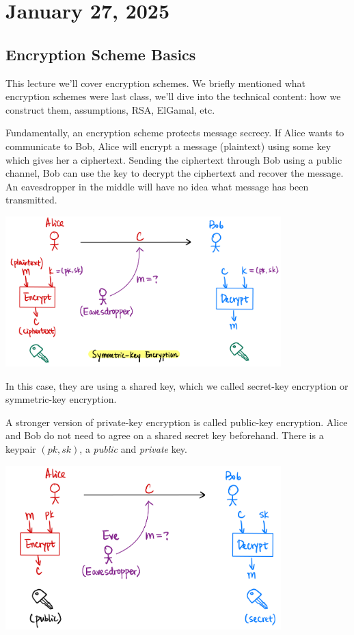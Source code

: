 \section{January 27, 2025}
\label{20250127}

\subsection{Encryption Scheme Basics}
This lecture we'll cover encryption schemes. We briefly mentioned what encryption schemes were last class, we'll dive into the technical content: how we construct them, assumptions, RSA, ElGamal, etc.

Fundamentally, an encryption scheme protects message secrecy. If Alice wants to communicate to Bob, Alice will encrypt a message (plaintext) using some key which gives her a ciphertext. Sending the ciphertext through Bob using a public channel, Bob can use the key to decrypt the ciphertext and recover the message. An eavesdropper in the middle will have no idea what message has been transmitted.

\begin{center}
    \includegraphics[width=0.8\textwidth]{images/2023-01-31/ske-intro.png}
\end{center}

In this case, they are using a shared key, which we called secret-key encryption or symmetric-key encryption.

A stronger version of private-key encryption is called public-key encryption. Alice and Bob do not need to agree on a shared secret key beforehand. There is a keypair $(pk, sk)$, a \emph{public} and \emph{private} key.

\begin{center}
    \includegraphics[width=0.8\textwidth]{images/2023-01-31/pke-intro.png}
\end{center}


